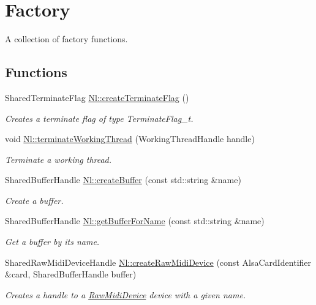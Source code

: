 \hypertarget{group__Factory}{\section{Factory}
\label{group__Factory}
}


A collection of factory functions.  


\subsection*{Functions}
\begin{DoxyCompactItemize}
\item 
Shared\-Terminate\-Flag \hyperlink{group__Factory_ga180b355af33debb50063b60a4af89cf3}{Nl\-::create\-Terminate\-Flag} ()
\begin{DoxyCompactList}\small\item\em Creates a terminate flag of type Terminate\-Flag\-\_\-t. \end{DoxyCompactList}\item 
void \hyperlink{group__Factory_ga6d8e041ef9eccaa2632c8fd74daa95b0}{Nl\-::terminate\-Working\-Thread} (Working\-Thread\-Handle handle)
\begin{DoxyCompactList}\small\item\em Terminate a working thread. \end{DoxyCompactList}\item 
Shared\-Buffer\-Handle \hyperlink{group__Factory_ga24ccbd96555db0e9f26bdfd1107a6fbd}{Nl\-::create\-Buffer} (const std\-::string \&name)
\begin{DoxyCompactList}\small\item\em Create a buffer. \end{DoxyCompactList}\item 
Shared\-Buffer\-Handle \hyperlink{group__Factory_ga1363b61570b3f73ca88d3b1362ad0432}{Nl\-::get\-Buffer\-For\-Name} (const std\-::string \&name)
\begin{DoxyCompactList}\small\item\em Get a buffer by its name. \end{DoxyCompactList}\item 
Shared\-Raw\-Midi\-Device\-Handle \hyperlink{group__Factory_ga2be78440b5fc8f46d0718a72a9fea3da}{Nl\-::create\-Raw\-Midi\-Device} (const Alsa\-Card\-Identifier \&card, Shared\-Buffer\-Handle buffer)
\begin{DoxyCompactList}\small\item\em Creates a handle to a \hyperlink{classNl_1_1RawMidiDevice}{Raw\-Midi\-Device} device with a given {\itshape name}. \end{DoxyCompactList}\item 

\end{DoxyCompactItemize}
